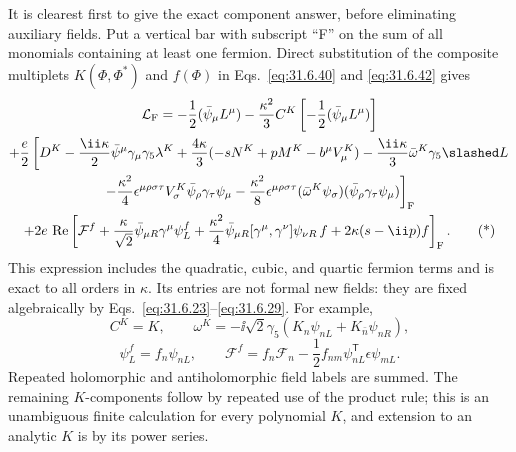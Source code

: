 \begin{enumerate}
  It is clearest first to give the exact component answer, before
  eliminating auxiliary fields.  Put a vertical bar with subscript
  ``F'' on the sum of all monomials containing at least one fermion.
  Direct substitution of the composite multiplets \(K(\Phi,\Phi^*)\)
  and \(f(\Phi)\) in Eqs.~\eqref{eq:31.6.40} and
  \eqref{eq:31.6.42} gives
  \begin{multline}
    \mathcal L_{\rm F}
    =-\frac12(\bar\psi_\mu L^\mu)
      -\frac{\kappa^2}{3}C^K
        \left[-\frac12(\bar\psi_\mu L^\mu)\right]\\
    +\frac e2\left[
      D^K-\frac{\ii\kappa}{2}
        \bar\psi^\mu\gamma_\mu\gamma_5\lambda^K
      +\frac{4\kappa}{3}(-sN^K+pM^K-b^\mu V_\mu^K)
      -\frac{\ii\kappa}{3}\bar\omega^K\gamma_5\slashed L\right.\\
    \left.
      -\frac{\kappa^2}{4}\epsilon^{\mu\rho\sigma\tau}V_\sigma^K
        \bar\psi_\rho\gamma_\tau\psi_\mu
      -\frac{\kappa^2}{8}\epsilon^{\mu\rho\sigma\tau}
        (\bar\omega^K\psi_\sigma)
        (\bar\psi_\rho\gamma_\tau\psi_\mu)
    \right]_{\rm F}\\
    +2e\,\operatorname{Re}\left[
      \mathcal F^f
      +\frac{\kappa}{\sqrt2}
        \bar\psi_{\mu R}\gamma^\mu\psi_L^f
      +\frac{\kappa^2}{4}
        \bar\psi_{\mu R}[\gamma^\mu,\gamma^\nu]\psi_{\nu R}\,f
      +2\kappa(s-\ii p)f
    \right]_{\rm F}.
    \tag{*}
  \end{multline}
  This expression includes the quadratic, cubic, and quartic fermion
  terms and is exact to all orders in \(\kappa\).  Its entries are not
  formal new fields: they are fixed algebraically by
  Eqs.~\eqref{eq:31.6.23}--\eqref{eq:31.6.29}.  For example,
  \[
    C^K=K,\qquad
    \omega^K=-\ii\sqrt2\gamma_5
      (K_n\psi_{nL}+K_{\bar n}\psi_{nR}),
  \]
  \[
    \psi_L^f=f_n\psi_{nL},\qquad
    \mathcal F^f
      =f_n\mathcal F_n
       -\frac12f_{nm}\psi_{nL}^{\mathsf T}
          \epsilon\psi_{mL}.
  \]
  Repeated holomorphic and antiholomorphic field labels are summed.
  The remaining \(K\)-components follow by repeated use of the product
  rule; this is an unambiguous finite calculation for every polynomial
  \(K\), and extension to an analytic \(K\) is by its power series.


\end{enumerate}
